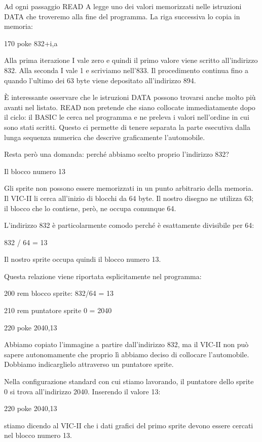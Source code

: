 \documentclass{article}
\begin{document}
Ad ogni passaggio READ A legge uno dei valori memorizzati nelle istruzioni DATA che troveremo alla fine del programma.
La riga successiva lo copia in memoria:

170 poke 832+i,a

Alla prima iterazione I vale zero e quindi il primo valore viene scritto all'indirizzo 832. Alla seconda I vale 1 e
scriviamo nell'833. Il procedimento continua fino a quando l'ultimo dei 63 byte viene depositato all'indirizzo 894.

È interessante osservare che le istruzioni DATA possono trovarsi anche molto più avanti nel listato. READ non pretende
che siano collocate immediatamente dopo il ciclo: il BASIC le cerca nel programma e ne preleva i valori nell'ordine in
cui sono stati scritti. Questo ci permette di tenere separata la parte esecutiva dalla lunga sequenza numerica che
descrive graficamente l'automobile.

Resta però una domanda: perché abbiamo scelto proprio l'indirizzo 832?

Il blocco numero 13

Gli sprite non possono essere memorizzati in un punto arbitrario della memoria. Il VIC-II li cerca all'inizio di blocchi
da 64 byte. Il nostro disegno ne utilizza 63; il blocco che lo contiene, però, ne occupa comunque 64.

L'indirizzo 832 è particolarmente comodo perché è esattamente divisibile per 64:

832 / 64 = 13

Il nostro sprite occupa quindi il blocco numero 13.

Questa relazione viene riportata esplicitamente nel programma:

200 rem blocco sprite: 832/64 = 13

210 rem puntatore sprite 0 = 2040

220 poke 2040,13

Abbiamo copiato l'immagine a partire dall'indirizzo 832, ma il VIC-II non può sapere autonomamente che proprio lì
abbiamo deciso di collocare l'automobile. Dobbiamo indicarglielo attraverso un puntatore sprite.

Nella configurazione standard con cui stiamo lavorando, il puntatore dello sprite 0 si trova all'indirizzo 2040.
Inserendo il valore 13:

220 poke 2040,13

stiamo dicendo al VIC-II che i dati grafici del primo sprite devono essere cercati nel blocco numero 13.
\end{document}
